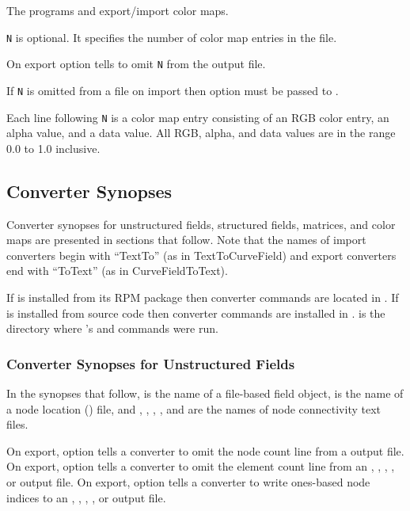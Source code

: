 The programs  and 
export/import color maps.

\verb|N| is optional.  It specifies the number of color map entries in
the file.

On export option  tells  to
omit \verb|N| from the output file.

If \verb|N| is omitted from a file on import then option
 must be passed to .

Each line following \verb|N| is a color map entry consisting of an RGB
color entry, an alpha value, and a data value.  All RGB, alpha, and
data values are in the range 0.0 to 1.0 inclusive.

\subsection{Converter Synopses}
\label{sec:converter_synopses}

Converter synopses for unstructured fields, structured fields, matrices,
and color maps are presented in sections that follow.   Note that
the names of import converters begin with ``TextTo'' (as in
TextToCurveField) and export converters end with ``ToText'' (as in
CurveFieldToText).

If \sr{} is installed from its RPM package then converter commands are
located in .  If \sr{} is installed
from source code then converter commands are installed in
.   is
the directory where \sr{}'s  and 
commands were run.

\subsubsection{Converter Synopses for Unstructured Fields}
\label{sec:unstruct_field_synopses}

In the synopses that follow,  is the name of a \sr{}
file-based field object,  is the name of a node location
() file, and , ,
, , and  are the names of node
connectivity text files.

On export, option  tells a converter to omit the
node count line from a  output file.  On export, option
 tells a converter to omit the element count
line from an , , ,
, or  output file.  On export, option
 tells a converter to write ones-based node
indices to an , , ,
, or  output file.

